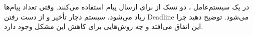 \question[14] 
در یک سیستم‌عامل ، دو تسک از  برای ارسال پیام استفاده می‌کنند.  
وقتی تعداد پیام‌ها زیاد می‌شود، سیستم دچار تأخیر و از دست رفتن Deadline می‌شود.  
توضیح دهید چرا این اتفاق می‌افتد و چه روش‌هایی برای کاهش این مشکل وجود دارد.

